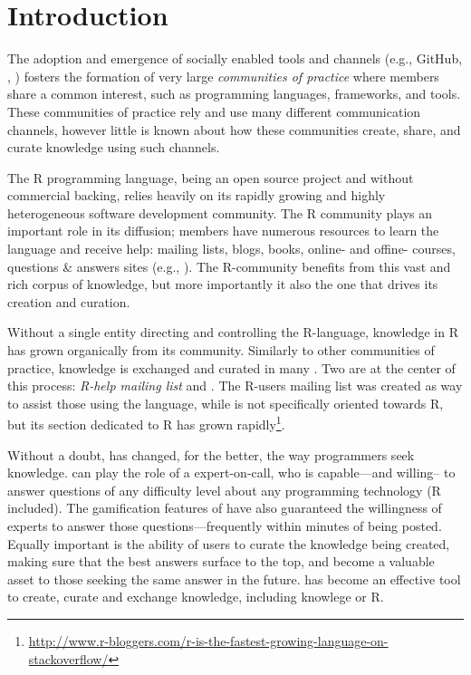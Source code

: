 \section{Introduction}
\label{cha:introduction}
The adoption and emergence of socially enabled tools and channels (e.g., GitHub, \SO, \ml) fosters the formation of very large \textit{communities of practice} where members share a common interest, such as programming languages, frameworks, and tools. These communities of practice rely and use many different communication channels, however little is known about how these communities create, share, and curate knowledge using such channels. 

The R programming language, being an open source project and without commercial backing, relies heavily on its rapidly growing and highly heterogeneous software development community. The R community plays an important role in its diffusion; members have numerous resources to learn the language and receive help: mailing lists, blogs, books, online- and offine- courses, questions \& answers sites (e.g., \SO). The R-community benefits from this vast and rich corpus of knowledge, but more importantly it also the one that drives its creation and curation.

Without a single entity directing and controlling the R-language, knowledge in R has grown organically from its community. Similarly to other communities of practice, knowledge is exchanged and curated in many \channels. Two \channels are at the center of this process: \textit{R-help mailing list} and \textit{\SO}. The R-users mailing list was created as way to assist those using the language, while \SO is not specifically oriented towards R, but its section dedicated to R has grown rapidly\footnote{\url{http://www.r-bloggers.com/r-is-the-fastest-growing-language-on-stackoverflow/}}.

Without a doubt, \SO has changed, for the better, the way programmers seek knowledge. \SO can play the role of a expert-on-call, who is capable---and willing--
to answer questions of any difficulty level about any programming technology (R included). The gamification features of \SO have also guaranteed the willingness of experts to answer
those questions---frequently within minutes of being posted. Equally important is the ability of \SO users to curate the knowledge being created, making sure that
the best answers surface to the top, and become a valuable asset to those seeking the same answer in the future. \SO has become an effective tool to create, curate and exchange knowledge, including knowlege or R.

